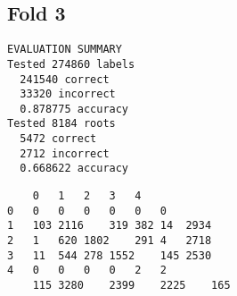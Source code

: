 \documentclass{sig-alternate}
\begin{document}
\subsection*{Fold 3}
\begin{lstlisting}
EVALUATION SUMMARY
Tested 274860 labels
  241540 correct
  33320 incorrect
  0.878775 accuracy
Tested 8184 roots
  5472 correct
  2712 incorrect
  0.668622 accuracy
\end{lstlisting}
\begin{lstlisting}
	0	1	2	3	4	
0	0	0	0	0	0	0
1	103	2116	319	382	14	2934
2	1	620	1802	291	4	2718
3	11	544	278	1552	145	2530
4	0	0	0	0	2	2
	115	3280	2399	2225	165

\end{lstlisting}

\balancecolumns %
\end{document}
